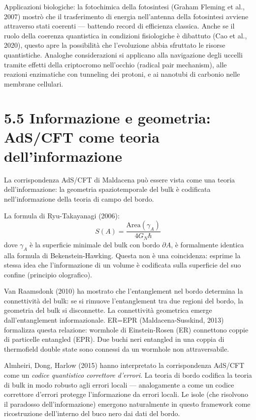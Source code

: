 \documentclass[11.5pt,a4paper,openany]{book}
\theoremstyle{remark}
\begin{document}
Applicazioni biologiche: la fotochimica della fotosintesi (Graham Fleming et al., 2007) mostrò che il trasferimento di energia nell'antenna della fotosintesi avviene attraverso stati coerenti --- battendo record di efficienza classica. Anche se il ruolo della coerenza quantistica in condizioni fisiologiche è dibattuto (Cao et al., 2020), questo apre la possibilità che l'evoluzione abbia sfruttato le risorse quantistiche. Analoghe considerazioni si applicano alla navigazione degli uccelli tramite effetti della criptocromo nell'occhio (radical pair mechanism), alle reazioni enzimatiche con tunneling dei protoni, e ai nanotubi di carbonio nelle membrane cellulari.

\section{5.5 Informazione e geometria: AdS/CFT come teoria dell'informazione}

La corrispondenza AdS/CFT di Maldacena può essere vista come una teoria dell'informazione: la geometria spaziotemporale del bulk è codificata nell'informazione della teoria di campo del bordo.

La formula di Ryu-Takayanagi (2006):
\[
S(A) = \frac{\text{Area}(\gamma_A)}{4G_N \hbar}
\]
dove $\gamma_A$ è la superficie minimale del bulk con bordo $\partial A$, è formalmente identica alla formula di Bekenstein-Hawking. Questa non è una coincidenza: esprime la stessa idea che l'informazione di un volume è codificata sulla superficie del suo confine (principio olografico).

Van Raamsdonk (2010) ha mostrato che l'entanglement nel bordo determina la connettività del bulk: se si rimuove l'entanglement tra due regioni del bordo, la geometria del bulk si disconnette. La connettività geometrica emerge dall'entanglement informazionale. ER=EPR (Maldacena-Susskind, 2013) formalizza questa relazione: wormhole di Einstein-Rosen (ER) connettono coppie di particelle entangled (EPR). Due buchi neri entangled in una coppia di thermofield double state sono connessi da un wormhole non attraversabile.

Almheiri, Dong, Harlow (2015) hanno interpretato la corrispondenza AdS/CFT come un \textit{codice quantistico correttore d'errori}. La teoria di bordo codifica la teoria di bulk in modo robusto agli errori locali --- analogamente a come un codice correttore d'errori protegge l'informazione da errori locali. Le isole (che risolvono il paradosso dell'informazione) emergono naturalmente in questo framework come ricostruzione dell'interno del buco nero dai dati del bordo.
\end{document}
